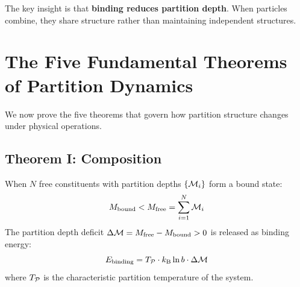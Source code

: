 The key insight is that \textbf{binding reduces partition depth}. When particles combine, they share structure rather than maintaining independent structures.

\section{The Five Fundamental Theorems of Partition Dynamics}
\label{sec:five_theorems}

We now prove the five theorems that govern how partition structure changes under physical operations.

\subsection{Theorem I: Composition}

\begin{theorem}
\label{thm:composition}
When $N$ free constituents with partition depths $\{\mathcal{M}_i\}$ form a bound state:
\begin{equation}
    M_{\mathrm{bound}} < M_{\mathrm{free}} = \sum_{i=1}^N \mathcal{M}_i
\end{equation}
The partition depth deficit $\Delta\mathcal{M} = M_{\mathrm{free}} - M_{\mathrm{bound}} > 0$ is released as binding energy:
\begin{equation}
    E_{\mathrm{binding}} = T_{\mathcal{P}} \cdot k_{\mathrm{B}} \ln b \cdot \Delta\mathcal{M}
\end{equation}
where $T_{\mathcal{P}}$ is the characteristic partition temperature of the system.
\end{theorem}

